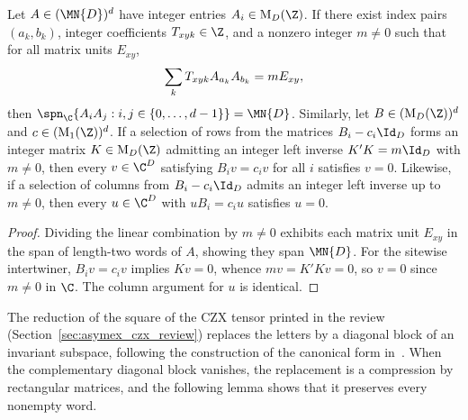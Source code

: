 \begin{lemma}%
    \label{thm:asymex_int_certificates}
    \leanok
    Let $A \in (\MN{D})^d$ have integer entries $A_i \in \mathrm{M}_D(\Z)$.
    If there exist index pairs $(a_k, b_k)$, integer coefficients
    $T_{xyk} \in \Z$, and a nonzero integer $m \ne 0$ such that for all matrix
    units $E_{xy}$,
    \begin{align}
        \sum_k T_{xyk} A_{a_k} A_{b_k} = m E_{xy}, \notag
    \end{align}
    then $\spn_{\C}\{A_i A_j : i,j \in \{0,\dots,d-1\}\} = \MN{D}$.
    Similarly, let $B \in (\mathrm{M}_D(\Z))^d$ and $c \in (\mathrm{M}_1(\Z))^d$.
    If a selection of rows from the matrices $B_i - c_i \Id_D$ forms an
    integer matrix $K \in \mathrm{M}_D(\Z)$ admitting an integer left inverse
    $K' K = m \Id_D$ with $m \ne 0$, then every $v \in \C^D$ satisfying
    $B_i v = c_i v$ for all $i$ satisfies $v = 0$.
    Likewise, if a selection of columns from $B_i - c_i \Id_D$ admits an
    integer left inverse up to $m \ne 0$, then every $u \in \C^D$ with
    $u B_i = c_i u$ satisfies $u = 0$.
\end{lemma}

\begin{proof}
    \leanok
    Dividing the linear combination by $m \ne 0$ exhibits each matrix unit
    $E_{xy}$ in the span of length-two words of $A$, showing they span
    $\MN{D}$. For the sitewise intertwiner, $B_i v = c_i v$ implies $K v = 0$,
    whence $m v = K' K v = 0$, so $v = 0$ since $m \ne 0$ in $\C$. The column
    argument for $u$ is identical.
\end{proof}

The reduction of the square of the CZX tensor printed in the review
(Section~\ref{sec:asymex_czx_review}) replaces the letters by a diagonal
block of an invariant subspace, following the construction of the canonical
form in~\cite[Section~IV]{Cirac2021Matrix}. When the complementary diagonal
block vanishes, the replacement is a compression by rectangular matrices,
and the following lemma shows that it preserves every nonempty word.

